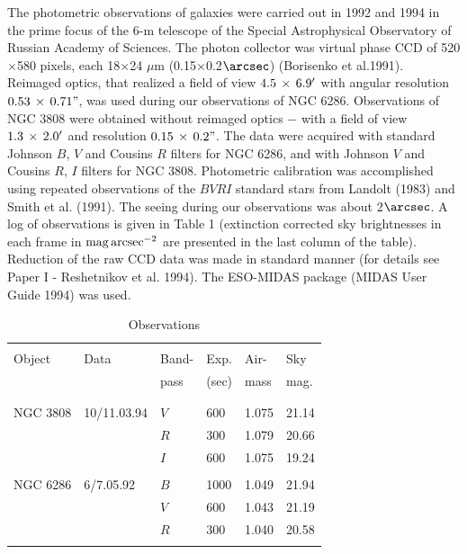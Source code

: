 The photometric observations of galaxies were carried out
in 1992 and 1994 in the prime focus of the 6-m telescope
of the Special Astrophysical Observatory of Russian Academy 
of Sciences. The photon collector was virtual phase CCD
of 520$\times$580 pixels, each 18$\times$24
$\mu$m (0.15$\times$0.2$\arcsec$) (Borisenko et al.1991).
Reimaged optics, that realized a field of view $\rm 4.5\,\times\,6.9'$
with angular resolution $\rm 0.53\,\times\,0.71"$, was used 
during our observations of NGC 6286. Observations of NGC 3808
were obtained without reimaged optics $-$ with a field of 
view $\rm 1.3\,\times\,2.0'$ and resolution $\rm 0.15\,\times\,
0.2"$. The data were acquired with standard Johnson $B$, $V$ and
Cousins $R$ filters for NGC 6286, and with Johnson $V$ and
Cousins $R$, $I$ filters for NGC 3808. Photometric calibration
was accomplished using repeated observations of the $BVRI$
standard stars from Landolt (1983) and Smith et al. (1991).
The seeing during our observations was about 2$\arcsec$. 
A log of observations is given in
Table 1 (extinction corrected sky brightnesses in each frame
in $\rm mag\,arcsec^{-2}$ are presented in the
last column of the table).
Reduction of the raw CCD data was made in standard manner
(for details see Paper I -
Reshetnikov et al. 1994). The ESO-MIDAS package
(MIDAS User Guide 1994) was used.

\begin{table}
\caption[1]{Observations} 
\begin{tabular}{llllll}
\\ \\
\hline
\\
Object&Data&Band-& Exp. & Air- & Sky \\
      &    &pass & (sec)& mass & mag. \\ \\
\hline \\
NGC 3808    & 10/11.03.94 & $V$ & 600 & 1.075 & 21.14   \\
            &             & $R$ & 300 & 1.079 & 20.66   \\
            &             & $I$ & 600 & 1.075 & 19.24   \\ \\
NGC 6286    & 6/7.05.92   & $B$ & 1000& 1.049 & 21.94 \\
            &             & $V$ & 600 & 1.043 & 21.19 \\
            &             & $R$ & 300 & 1.040 & 20.58 \\ \\
\hline
\end{tabular}
\end{table}

